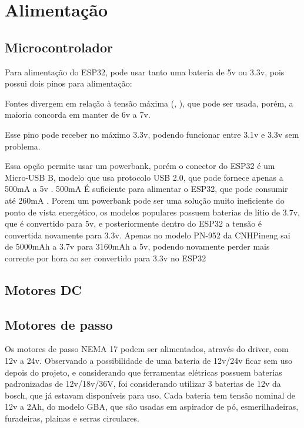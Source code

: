 
\section{Alimentação}


\subsection{Microcontrolador}

Para alimentação do ESP32, pode usar tanto uma bateria de 5v ou 3.3v, pois possui dois pinos para alimentação: 


Fontes divergem em relação à tensão máxima (\cite{esp32_reference_power_supply_1}, \cite{esp32_reference_power_supply_2}),
que pode ser usada, porém, a maioria concorda em manter de 6v a 7v.

Esse pino pode receber no máximo 3.3v, podendo funcionar entre 3.1v e 3.3v sem problema.

Essa opção permite usar um powerbank, porém o conector do ESP32 é um Micro-USB B, modelo que usa protocolo USB 2.0, que pode fornece apenas a 500mA a 5v \cite{micro_usb_b}.
500mA É suficiente para alimentar o ESP32, que pode consumir até 260mA \cite{esp_max_current}.
Porem um powerbank pode ser uma solução muito ineficiente do ponto de vista energético, os modelos populares possuem baterias de lítio de 3.7v, que é convertido para 5v,
e posteriormente dentro do ESP32 a tensão é convertida novamente para 3.3v. Apenas no modelo PN-952 da CNHPineng sai de 5000mAh a 3.7v  para 3160mAh a 5v,
podendo novamente perder mais corrente por hora ao ser convertido para 3.3v no ESP32


\subsection{Motores DC}
\lipsum[1]

\subsection{Motores de passo}

Os motores de passo NEMA 17 podem ser alimentados, através do driver, com 12v a 24v.
Observando a possibilidade de uma bateria de 12v/24v ficar sem uso depois do projeto,
e considerando que ferramentas elétricas possuem baterias padronizadas de 12v/18v/36V, foi considerando utilizar 3 baterias de 12v da bosch, que já estavam disponíveis para uso.
Cada bateria tem tensão nominal de 12v a 2Ah, do modelo GBA, que são usadas em aspirador de pó, esmerilhadeiras, furadeiras, plainas e serras circulares.

